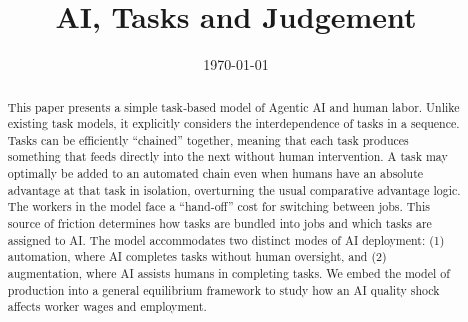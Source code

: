 \documentclass{article}
\theoremstyle{plain}
\theoremstyle{plain}
\begin{document}
\title{AI, Tasks and Judgement}
\author{}
\date{\today{}}



\newcommand{\machine}[1]{\langle #1 \rangle}
\newcommand{\human}[1]{( #1 )}
\newcommand{\cost}[1]{C\{ #1 \}}
\newcommand{\costdo}[1]{T_H\{ #1 \}}
\newcommand{\costmanage}[1]{T_M\{ #1 \}}
\newcommand{\timecost}[1]{t_{#1}}
\newcommand{\hccost}[1]{c_{#1}}
\newcommand{\labor}[1]{l_{#1}}
\newcommand{\handofftime}[1]{t_{s#1}}
\newcommand{\humantime}[1]{t^{h}_{#1}}
\newcommand{\machinetime}[1]{t^{m}_{#1}}
\newcommand{\humanhc}[1]{c^{h}_{#1}}
\newcommand{\machinehc}[1]{c^{m}_{#1}}



\newcommand{\topic}[1]{\paragraph{#1}}

\renewcommand{\arraystretch}{1.75} %

\maketitle

\begin{abstract}
\noindent
This paper presents a simple task‐based model of Agentic AI and human labor.  
Unlike existing task models, it explicitly considers the interdependence of tasks in a sequence.  
Tasks can be efficiently ``chained'' together, meaning that each task produces something that feeds directly into the next without human intervention.  
A task may optimally be added to an automated chain even when humans have an absolute advantage at that task in isolation, overturning the usual comparative advantage logic.  
The workers in the model face a ``hand-off'' cost for switching between jobs.
This source of friction determines how tasks are bundled into jobs and which tasks are assigned to AI.
The model accommodates two distinct modes of AI deployment: (1) automation, where AI completes tasks without human oversight, and (2) augmentation, where AI assists humans in completing tasks.
We embed the model of production into a general equilibrium framework to study how an AI quality shock affects worker wages and employment. 
\end{abstract}
\end{document}
